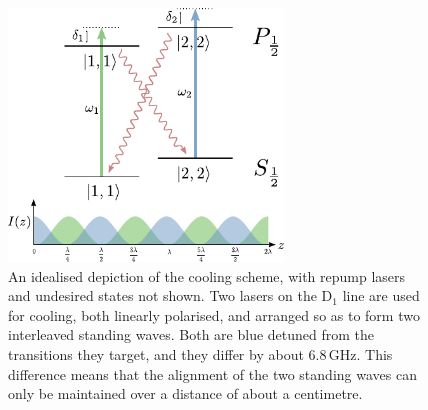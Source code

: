 \begin{figure}
\begin{center}
\includegraphics[width=0.65\textwidth]{figures/cooling_simplified.pdf}
\caption{\label{fig:cooling_simplified}An idealised depiction of the cooling scheme, with repump lasers and undesired states not shown. Two lasers on the D$_1$ line are used for cooling, both linearly polarised, and arranged so as to form two interleaved standing waves. Both are blue detuned from the transitions they target, and they differ by about $6.8\,$GHz. This difference means that the alignment of the two standing waves can only be maintained over a distance of about a centimetre.}
\end{center}
\end{figure}

\lipsum[1-5]
